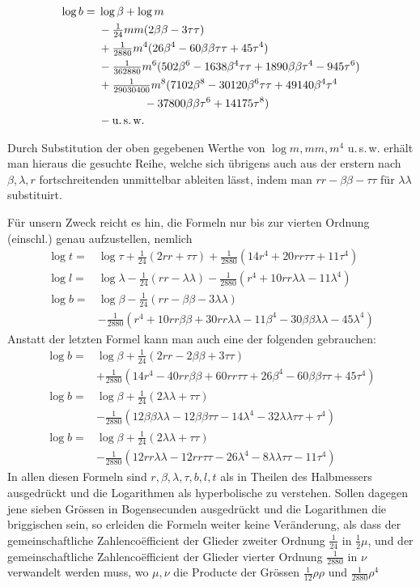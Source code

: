 \[
\begin{aligned}
\log b={}&\log\beta+\log m\\
&-\tfrac1{24}mm(2\beta\beta-3\tau\tau)\\
&+\tfrac1{2880}m^4(26\beta^4-60\beta\beta\tau\tau+45\tau^4)\\
&-\tfrac1{362880}m^6(502\beta^6-1638\beta^4\tau\tau+1890\beta\beta\tau^4-945\tau^6)\\
&+\tfrac1{29030400}m^8(7102\beta^8-30120\beta^6\tau\tau+49140\beta^4\tau^4\\
&\qquad\qquad-37800\beta\beta\tau^6+14175\tau^8)\\
&-\text{u.\,s.\,w.}
\end{aligned}
\]

\indent Durch Substitution der oben gegebenen Werthe von \(\log m,mm,m^4\) u.\,s.\,w. erhält man hieraus die gesuchte Reihe, welche sich übrigens auch aus der erstern nach \(\beta,\lambda,r\) fortschreitenden unmittelbar ableiten lässt, indem man \(rr-\beta\beta-\tau\tau\) für \(\lambda\lambda\) substituirt.

Für unsern Zweck reicht es hin, die Formeln nur bis zur vierten Ordnung (einschl.) genau aufzustellen, nemlich
\[
\begin{aligned}
\log t={}&\log\tau+\tfrac1{24}(2rr+\tau\tau)+\tfrac1{2880}(14r^4+20rr\tau\tau+11\tau^4)\\
\log l={}&\log\lambda-\tfrac1{24}(rr-\lambda\lambda)-\tfrac1{2880}(r^4+10rr\lambda\lambda-11\lambda^4)\\
\log b={}&\log\beta-\tfrac1{24}(rr-\beta\beta-3\lambda\lambda)\\
&-\tfrac1{2880}(r^4+10rr\beta\beta+30rr\lambda\lambda-11\beta^4-30\beta\beta\lambda\lambda-45\lambda^4)
\end{aligned}
\]
Anstatt der letzten Formel kann man auch eine der folgenden gebrauchen:
\[
\begin{aligned}
\log b={}&\log\beta+\tfrac1{24}(2rr-2\beta\beta+3\tau\tau)\\
&+\tfrac1{2880}(14r^4-40rr\beta\beta+60rr\tau\tau+26\beta^4-60\beta\beta\tau\tau+45\tau^4)\\
\log b={}&\log\beta+\tfrac1{24}(2\lambda\lambda+\tau\tau)\\
&-\tfrac1{2880}(12\beta\beta\lambda\lambda-12\beta\beta\tau\tau-14\lambda^4-32\lambda\lambda\tau\tau+\tau^4)\\
\log b={}&\log\beta+\tfrac1{24}(2\lambda\lambda+\tau\tau)\\
&-\tfrac1{2880}(12rr\lambda\lambda-12rr\tau\tau-26\lambda^4-8\lambda\lambda\tau\tau-11\tau^4)
\end{aligned}
\]
In allen diesen Formeln sind \(r,\beta,\lambda,\tau,b,l,t\) als in Theilen des Halbmessers ausgedrückt und die Logarithmen als hyperbolische zu verstehen. Sollen dagegen jene sieben Grössen in Bogensecunden ausgedrückt und die Logarithmen die briggischen sein, so erleiden die Formeln weiter keine Veränderung, als dass der gemeinschaftliche Zahlencoëfficient der Glieder zweiter Ordnung \(\frac1{24}\) in \(\frac12\mu\), und der gemeinschaftliche Zahlencoëfficient der Glieder vierter Ordnung \(\frac1{2880}\) in \(\nu\) verwandelt werden muss, wo \(\mu,\nu\) die Producte der Grössen \(\frac1{12}\rho\rho\) und \(\frac1{2880}\rho^4\)

